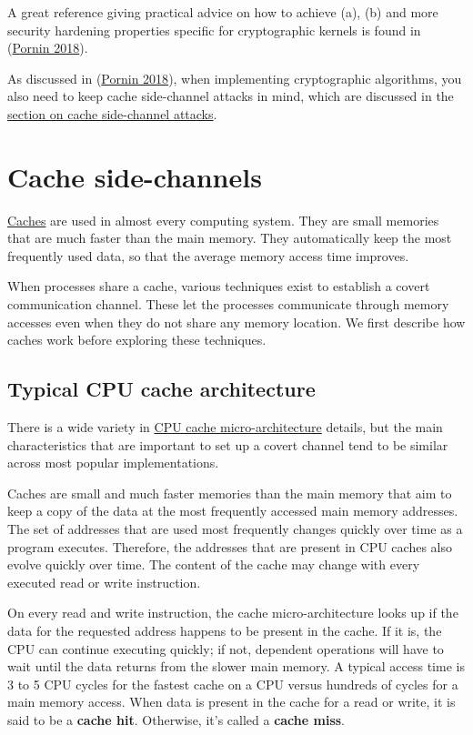 \documentclass[
  a4paper,
]{report}
\begin{document}
A great reference giving practical advice on how to achieve (a), (b) and
more security hardening properties specific for cryptographic kernels is
found in (\protect\hyperlink{ref-Pornin2018}{Pornin 2018}).

As discussed in (\protect\hyperlink{ref-Pornin2018}{Pornin 2018}), when
implementing cryptographic algorithms, you also need to keep cache
side-channel attacks in mind, which are discussed in the
\protect\hyperlink{cache-side-channel-attacks}{section on cache
side-channel attacks}.

\hypertarget{cache-side-channels}{%
\section{Cache side-channels}\label{cache-side-channels}}

\href{https://en.wikipedia.org/wiki/Cache_(computing)}{Caches}
are used in almost every computing system. They are small memories that
are much faster than the main memory. They automatically keep the most
frequently used data, so that the average memory access time improves.

When processes share a cache, various techniques exist to establish a
covert communication channel. These let the processes communicate
through memory accesses even when they do not share any memory location.
We first describe how caches work before exploring these techniques.

\hypertarget{typical-cpu-cache-architecture}{%
\subsection{Typical CPU cache
architecture}\label{typical-cpu-cache-architecture}}

There is a wide variety in
\href{https://en.wikipedia.org/wiki/CPU_cache}{CPU cache
micro-architecture} details, but the main characteristics that are
important to set up a covert channel tend to be similar across most
popular implementations.

Caches are small and much faster memories than the main memory that aim
to keep a copy of the data at the most frequently accessed main memory
addresses. The set of addresses that are used most frequently changes
quickly over time as a program executes. Therefore, the addresses that
are present in CPU caches also evolve quickly over time. The content of
the cache may change with every executed read or write instruction.

On every read and write instruction, the cache micro-architecture looks
up if the data for the requested address happens to be present in the
cache. If it is, the CPU can continue executing quickly; if not,
dependent operations will have to wait until the data returns from the
slower main memory. A typical access time is 3 to 5 CPU cycles for the
fastest cache on a CPU versus hundreds of cycles for a main memory
access. When data is present in the cache for
a read or write, it is said to be a \textbf{cache hit}. Otherwise, it's called a \textbf{cache miss}.
\end{document}

